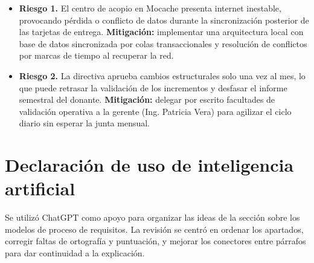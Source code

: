 \documentclass[11pt,a4paper]{article}
\begin{document}
\begin{itemize}
    \item \textbf{Riesgo 1.} El centro de acopio en Mocache presenta internet inestable, provocando pérdida o conflicto de datos durante la sincronización posterior de las tarjetas de entrega.
    \newline
    \textbf{Mitigación:} implementar una arquitectura local con base de datos sincronizada por colas transaccionales y resolución de conflictos por marcas de tiempo al recuperar la red.
    \item \textbf{Riesgo 2.} La directiva aprueba cambios estructurales solo una vez al mes, lo que puede retrasar la validación de los incrementos y desfasar el informe semestral del donante.
    \newline
    \textbf{Mitigación:} delegar por escrito facultades de validación operativa a la gerente (Ing. Patricia Vera) para agilizar el ciclo diario sin esperar la junta mensual.
\end{itemize}

\printbibliography[title={Referencias}]

\section*{Declaración de uso de inteligencia artificial}

Se utilizó ChatGPT como apoyo para organizar las ideas de la sección sobre los modelos de proceso de requisitos. La revisión se centró en ordenar los apartados, corregir faltas de ortografía y puntuación, y mejorar los conectores entre párrafos para dar continuidad a la explicación.
\end{document}
